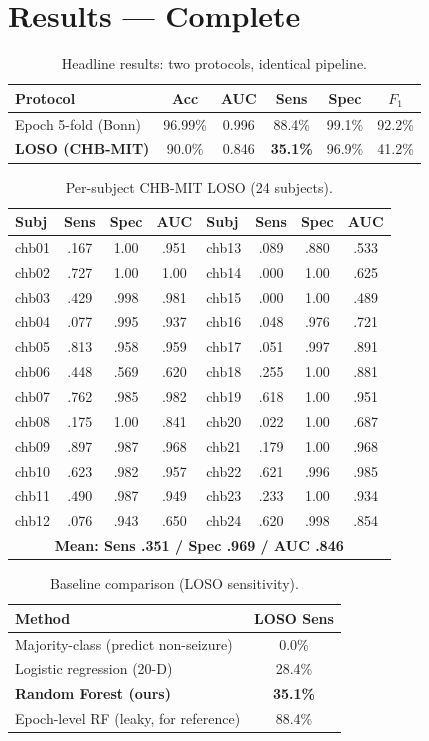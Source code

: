 \documentclass[10pt,journal,twocolumn]{IEEEtran}
\begin{document}
\section{Results --- Complete}
\begin{table}[t]\centering\caption{Headline results: two protocols, identical pipeline.}\label{tab:head}
\begin{tabular}{lccccc}\toprule
Protocol & Acc & AUC & Sens & Spec & $F_1$\\\midrule
Epoch 5-fold (Bonn) & 96.99\% & 0.996 & 88.4\% & 99.1\% & 92.2\%\\
\textbf{LOSO (CHB-MIT)} & 90.0\% & 0.846 & \textbf{35.1\%} & 96.9\% & 41.2\%\\\bottomrule
\end{tabular}\end{table}

\begin{table}[t]\centering\caption{Per-subject CHB-MIT LOSO (24 subjects).}\label{tab:full}
\footnotesize\begin{tabular}{lccc|lccc}\toprule
Subj & Sens & Spec & AUC & Subj & Sens & Spec & AUC\\\midrule
chb01&.167&1.00&.951 & chb13&.089&.880&.533\\
chb02&.727&1.00&1.00 & chb14&.000&1.00&.625\\
chb03&.429&.998&.981 & chb15&.000&1.00&.489\\
chb04&.077&.995&.937 & chb16&.048&.976&.721\\
chb05&.813&.958&.959 & chb17&.051&.997&.891\\
chb06&.448&.569&.620 & chb18&.255&1.00&.881\\
chb07&.762&.985&.982 & chb19&.618&1.00&.951\\
chb08&.175&1.00&.841 & chb20&.022&1.00&.687\\
chb09&.897&.987&.968 & chb21&.179&1.00&.968\\
chb10&.623&.982&.957 & chb22&.621&.996&.985\\
chb11&.490&.987&.949 & chb23&.233&1.00&.934\\
chb12&.076&.943&.650 & chb24&.620&.998&.854\\\midrule
\multicolumn{8}{c}{\textbf{Mean: Sens .351 / Spec .969 / AUC .846}}\\\bottomrule
\end{tabular}\end{table}

\begin{table}[t]\centering\caption{Baseline comparison (LOSO sensitivity).}\label{tab:base}
\begin{tabular}{lc}\toprule
Method & LOSO Sens\\\midrule
Majority-class (predict non-seizure) & 0.0\%\\
Logistic regression (20-D) & 28.4\%\\
\textbf{Random Forest (ours)} & \textbf{35.1\%}\\
Epoch-level RF (leaky, for reference) & 88.4\%\\\bottomrule
\end{tabular}\end{table}
\end{document}
